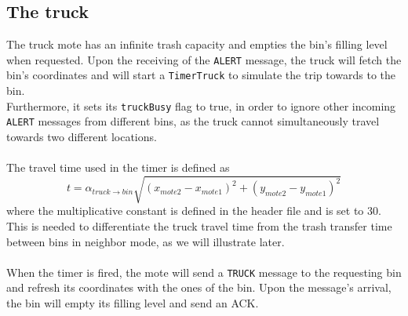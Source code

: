 \documentclass[a4paper,10pt]{article}
\begin{document}
\subsection{The truck}
The truck mote has an infinite trash capacity and empties the bin's filling level when requested. Upon the receiving of the \texttt{ALERT} message, the truck will fetch the bin's coordinates and will start a \texttt{TimerTruck} to simulate the trip towards to the bin. \\ Furthermore, it sets its \texttt{truckBusy} flag to true, in order to ignore other incoming \texttt{ALERT} messages from different bins, as the truck cannot simultaneously travel towards two different locations. \\ \\
The travel time used in the timer is defined as
\begin{equation} \label{xd}
	t=\alpha_{truck\rightarrow bin}\sqrt{\left(x_{mote2} - x_{mote1}\right)^2 + \left(y_{mote2} - y_{mote1}\right)^2}
\end{equation}
where the multiplicative constant is defined in the header file and is set to 30.  This is needed to differentiate the truck travel time from the trash transfer time between bins in neighbor mode, as we will illustrate later. \\\\
When the timer is fired, the mote will send a \texttt{TRUCK} message to the requesting bin and refresh its coordinates with the ones of the bin. Upon the message's arrival, the bin will empty its filling level and send an ACK.
\end{document}
